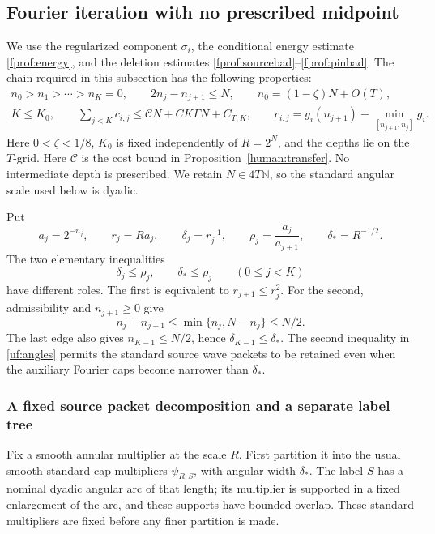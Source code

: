 \subsection{Fourier iteration with no prescribed midpoint}
\label{uf:transfer}

We use the regularized component \(\sigma_i\), the conditional energy
estimate \eqref{fprof:energy}, and the deletion estimates
\eqref{fprof:sourcebad}--\eqref{fprof:pinbad}. The chain required in this
subsection has the following properties:
\begin{gather}\label{uf:chain}
 n_0>n_1>\cdots>n_K=0,\qquad 2n_j-n_{j+1}\leq N,\qquad
 n_0=(1-\zeta)N+O(T),\\
 K\leq K_0,\qquad
 \sum_{j<K}c_{i,j}\leq\mathcal C N+C K\Gamma N+C_{T,K},\qquad
 c_{i,j}=g_i(n_{j+1})-\min_{[n_{j+1},n_j]}g_i.\nonumber
\end{gather}
Here \(0<\zeta<1/8\), \(K_0\) is fixed independently of \(R=2^N\),
and the depths lie on the \(T\)-grid. Here \(\mathcal C\) is the cost bound in
Proposition~\ref{human:transfer}. No intermediate depth is prescribed.
We retain \(N\in4T\mathbb N\), so the standard angular scale
used below is dyadic.

Put
$$
 a_j=2^{-n_j},\qquad r_j=Ra_j,\qquad
 \delta_j=r_j^{-1},\qquad
 \rho_j=\frac{a_j}{a_{j+1}},\qquad
 \delta_*=R^{-1/2}.
$$
The two elementary inequalities
\begin{equation}\label{uf:angles}
 \delta_j\leq\rho_j,\qquad \delta_*\leq\rho_j
 \qquad(0\leq j<K)
\end{equation}
have different roles. The first is equivalent to
\(r_{j+1}\leq r_j^2\). For the second, admissibility and
\(n_{j+1}\geq0\) give
$$
 n_j-n_{j+1}\leq\min\{n_j,N-n_j\}\leq N/2.
$$
The last edge also gives \(n_{K-1}\leq N/2\), hence
\(\delta_{K-1}\leq\delta_*\). The second inequality in
\eqref{uf:angles} permits the standard source wave packets to be retained
even when the auxiliary Fourier caps become narrower than \(\delta_*\).

\subsubsection*{A fixed source packet decomposition and a separate label tree}

Fix a smooth annular multiplier at the scale \(R\). First partition it
into the usual smooth standard-cap multipliers \(\psi_{R,S}\), with
angular width \(\delta_*\). The label \(S\) has a nominal dyadic angular
arc of that length; its multiplier is supported in a fixed enlargement
of the arc, and these supports have bounded overlap. These standard
multipliers are fixed before any finer partition is made.

